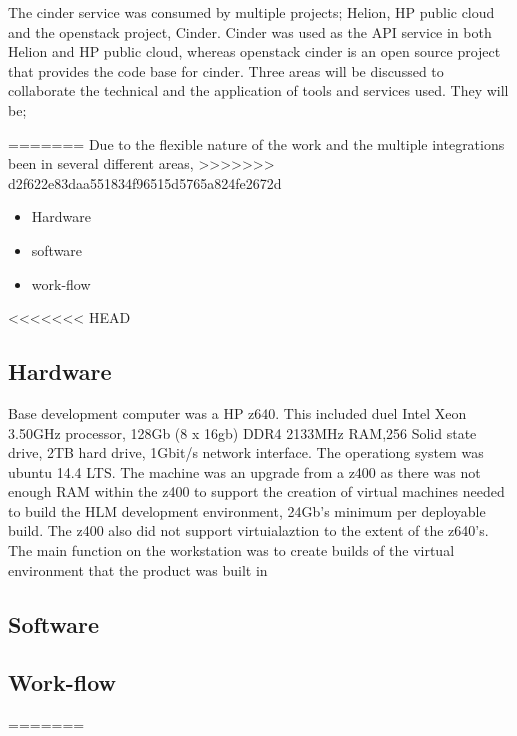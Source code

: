 \documentclass[11pt,a4paper]{report}
\begin{document}

The cinder service was consumed by multiple projects; Helion, HP public cloud and the openstack project, Cinder. Cinder was used as the API service in both Helion and HP public cloud, whereas openstack cinder is an open source project that provides the code base for cinder. Three areas will be discussed to collaborate the technical and the application of tools and services used. They will be;

=======
Due to the flexible nature of the work and the multiple integrations  been in several different areas, 
>>>>>>> d2f622e83daa551834f96515d5765a824fe2672d
\begin{itemize}
\item Hardware
\item software
\item work-flow
\end{itemize} 

<<<<<<< HEAD
\subsection{Hardware}
Base development computer was a HP z640. This included duel Intel Xeon 3.50GHz processor, 128Gb (8 x 16gb) DDR4 2133MHz RAM,256 Solid state drive, 2TB hard drive, 1Gbit/s network interface. The operationg system was ubuntu 14.4 LTS. The machine was an upgrade from a z400 as there was not enough RAM within the z400 to support the creation of virtual machines needed to build the HLM development environment, 24Gb's minimum per deployable build. The z400 also did not support virtuialaztion  to the extent of the z640's. The main function on the workstation was to create builds of the virtual environment that the product was built in  

\subsection{Software}

\subsection{Work-flow}
=======
\end{document}
